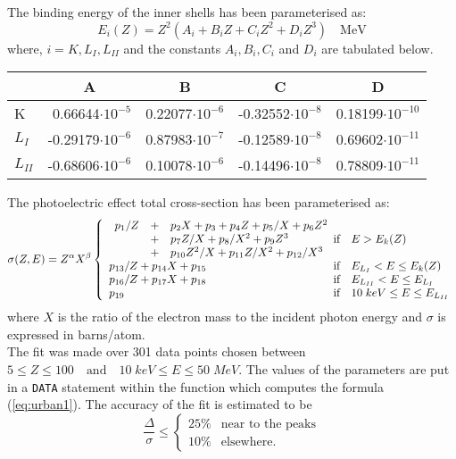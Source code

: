 The binding energy of the inner shells has been parameterised as:
\begin{equation}
 E_i (Z) = Z^2 (A_i + B_i Z + C_i Z^2 + D_i Z^3 ) \quad  \mbox{MeV}
\end{equation}
where, $ i = K, L_I, L_{II} $ and the constants $A_i, B_i, C_i$ and $D_i$
are tabulated below.\\
\begin{center}\begin{tabular}{|l|r|r|r|r|}
\hline
& \multicolumn{1}{c|}{A}
& \multicolumn{1}{c|}{B}
& \multicolumn{1}{c|}{C}
& \multicolumn{1}{c|}{D} \\
\hline
K        & 0.66644$\cdot 10^{-5}$& 0.22077$\cdot 10^{-6}$& -0.32552$\cdot 10^{-8}$& 0.18199$\cdot 10^{-10}$\\
$L_I$    &-0.29179$\cdot 10^{-6}$& 0.87983$\cdot 10^{-7}$& -0.12589$\cdot 10^{-8}$& 0.69602$\cdot 10^{-11}$\\
$L_{II}$ &-0.68606$\cdot 10^{-6}$& 0.10078$\cdot 10^{-6}$& -0.14496$\cdot 10^{-8}$& 0.78809$\cdot 10^{-11}$\\
\hline
\end{tabular}\end{center}
The photoelectric effect total cross-section has been parameterised as:
\begin{equation}
\sigma(Z,E)=Z^{\alpha} X^{\beta}
  \left\{\begin{array}{l@{}l}
   \begin{array}{lll}
   p_1/Z & + & p_2 X+p_3+p_4 Z+p_5/X+p_6 Z^2 \\
   & +& p_7 Z/X+p_8/X^2+p_9 Z^3  \\
   & +& p_{10} Z^2/X+p_{11} Z/X^2+p_{12}/X^3
   \end{array}
                             &  \mbox{if\quad} E >E_k(Z)  \\
   p_{13}/Z+p_{14}X+p_{15} & \mbox{if\quad } E_{L_I}< E \leq E_k(Z) \\
   p_{16}/Z+p_{17}X+p_{18} & \mbox{if\quad } E_{L_{II}}<E\leq E_{L_I}\\
   p_{19} & \mbox{if\quad } 10 \; keV \leq E \leq E_{L_{II}}
  \end{array}\right.
\label{eq:urban1}
\end{equation}
where $X$ is the ratio of the electron mass to the incident photon energy
and $\sigma$ is expressed in barns/atom.\\
The fit was made over 301 data points chosen between
$5 \leq Z \leq 100\quad \mbox{and} \quad 10 \; keV \leq E \leq 50\; MeV $.
The values of the parameters are put in
a {\tt DATA} statement within the function 
which computes the formula (\ref{eq:urban1}).
The accuracy of the fit is estimated to be
\begin{displaymath}
 \frac{\Delta}{\sigma} \leq 
    \left\{
        \begin{array}{ll} 25\% & \mbox{near to the peaks} \\
                          10\% & \mbox{elsewhere.}
         \end{array}
    \right.
\end{displaymath}
 
